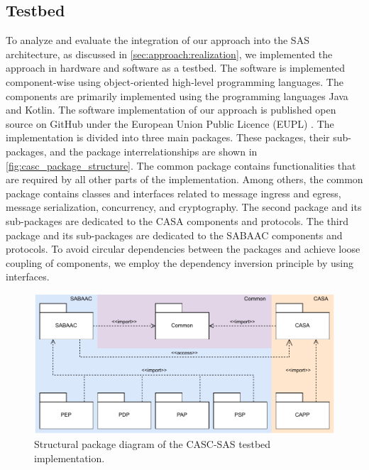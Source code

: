\subsection{Testbed}
To analyze and evaluate the integration of our approach into the SAS architecture, as discussed in \autoref{sec:approach:realization}, we implemented the approach in hardware and software as a testbed.
The software is implemented component-wise using object-oriented high-level programming languages.
The components are primarily implemented using the programming languages Java and Kotlin.
The software implementation of our approach is published open source on GitHub \cite{gitcasc} under the European Union Public Licence (EUPL) \cite{eupl}.
The implementation is divided into three main packages.
These packages, their sub-packages, and the package interrelationships are shown in \autoref{fig:casc_package_structure}.
The common package contains functionalities that are required by all other parts of the implementation.
Among others, the common package contains classes and interfaces related to message ingress and egress, message serialization, concurrency, and cryptography.
The second package and its sub-packages are dedicated to the CASA components and protocols.
The third package and its sub-packages are dedicated to the SABAAC components and protocols.
To avoid circular dependencies between the packages and achieve loose coupling of components, we employ the dependency inversion principle by using interfaces.
\begin{figure}
    \centering
    \includegraphics[width=0.9\linewidth]{figures/package_structure.drawio.pdf}
    \caption{Structural package diagram of the CASC-SAS testbed implementation.}
    \label{fig:casc_package_structure}
\end{figure}

